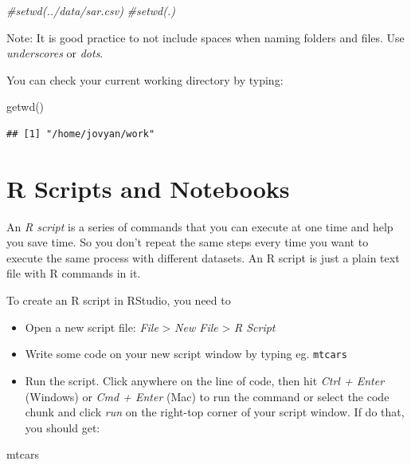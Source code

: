 \documentclass[
]{book}
\newenvironment{Shaded}{\begin{snugshade}}{\end{snugshade}}
\newcommand{\CommentTok}[1]{\textcolor[rgb]{0.56,0.35,0.01}{\textit{#1}}}
\newcommand{\FunctionTok}[1]{\textcolor[rgb]{0.00,0.00,0.00}{#1}}
\newcommand{\NormalTok}[1]{#1}
\begin{document}
\begin{Shaded}
\begin{Highlighting}[]
\CommentTok{\#setwd(\textquotesingle{}../data/sar.csv\textquotesingle{})}
\CommentTok{\#setwd(\textquotesingle{}.\textquotesingle{})}
\end{Highlighting}
\end{Shaded}

Note: It is good practice to not include spaces when naming folders and files. Use \emph{underscores} or \emph{dots}.

You can check your current working directory by typing:

\begin{Shaded}
\begin{Highlighting}[]
\FunctionTok{getwd}\NormalTok{()}
\end{Highlighting}
\end{Shaded}

\begin{verbatim}
## [1] "/home/jovyan/work"
\end{verbatim}

\hypertarget{r-scripts-and-notebooks}{%
\section{R Scripts and Notebooks}\label{r-scripts-and-notebooks}}

An \emph{R script} is a series of commands that you can execute at one time and help you save time. So you don't repeat the same steps every time you want to execute the same process with different datasets. An R script is just a plain text file with R commands in it.

To create an R script in RStudio, you need to

\begin{itemize}
\item
  Open a new script file: \emph{File} \textgreater{} \emph{New File} \textgreater{} \emph{R Script}
\item
  Write some code on your new script window by typing eg. \texttt{mtcars}
\item
  Run the script. Click anywhere on the line of code, then hit \emph{Ctrl + Enter} (Windows) or \emph{Cmd + Enter} (Mac) to run the command or select the code chunk and click \emph{run} on the right-top corner of your script window. If do that, you should get:
\end{itemize}

\begin{Shaded}
\begin{Highlighting}[]
\NormalTok{mtcars}
\end{Highlighting}
\end{Shaded}
\end{document}
